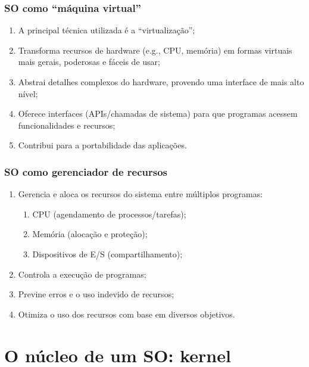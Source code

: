 \documentclass{beamer}
\begin{document}
\begin{frame}[fragile]
    \frametitle{SO como ``máquina virtual''}

    \begin{enumerate}\small
        \item A principal técnica utilizada é a ``virtualização'';
        \item Transforma recursos de hardware (e.g., CPU, memória) em formas virtuais mais gerais, poderosas e fáceis de usar;
        \item Abstrai detalhes complexos do hardware, provendo uma interface de mais alto nível;
        \item Oferece interfaces (APIs/chamadas de sistema) para que programas acessem funcionalidades e recursos;
        \item Contribui para a portabilidade das aplicações.
    \end{enumerate}
\end{frame}

\begin{frame}[fragile]
    \frametitle{SO como gerenciador de recursos}

    \begin{enumerate}\small
        \item Gerencia e aloca os recursos do sistema entre múltiplos programas:
        \begin{enumerate}\footnotesize
            \item CPU (agendamento de processos/tarefas);
            \item Memória (alocação e proteção);
            \item Dispositivos de E/S (compartilhamento);
        \end{enumerate}
        \item Controla a execução de programas;
        \item Previne erros e o uso indevido de recursos;
        \item Otimiza o uso dos recursos com base em diversos objetivos.
    \end{enumerate}
\end{frame}

\section{O núcleo de um SO: kernel}
\end{document}
